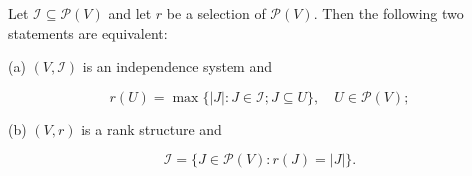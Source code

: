 Let $\mathcal{I} \subseteq \mathcal{P}(V)$ and let $r$ be a selection of $\mathcal{P}(V)$. Then the following two statements are equivalent:

(a) $(V, \mathcal{I})$ is an independence system and

$$r(U) = \max\{|J| : J \in \mathcal{I}; J \subseteq U\}, \quad U \in \mathcal{P}(V);$$

(b) $(V, r)$ is a rank structure and

$$\mathcal{I} = \{J \in \mathcal{P}(V) : r(J) = |J|\}.$$
